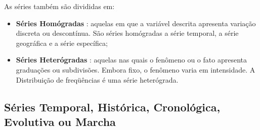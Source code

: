 As séries também são divididas em:


\begin{itemize}
  \item \textbf{Séries Homógradas} : aquelas em que a variável descrita apresenta variação discreta ou descontínua. São séries homógradas a série temporal, a série geográfica e a série específica;
 \item \textbf{Séries Heterógradas} : aquelas nas quais o fenômeno ou o fato apresenta graduações ou subdivisões. Embora fixo, o fenômeno varia em intensidade. A Distribuição de freqüências é uma série heterógrada.
\end{itemize}

\newpage






\newpage 
\subsection{Séries Temporal, Histórica, Cronológica, Evolutiva ou Marcha}

